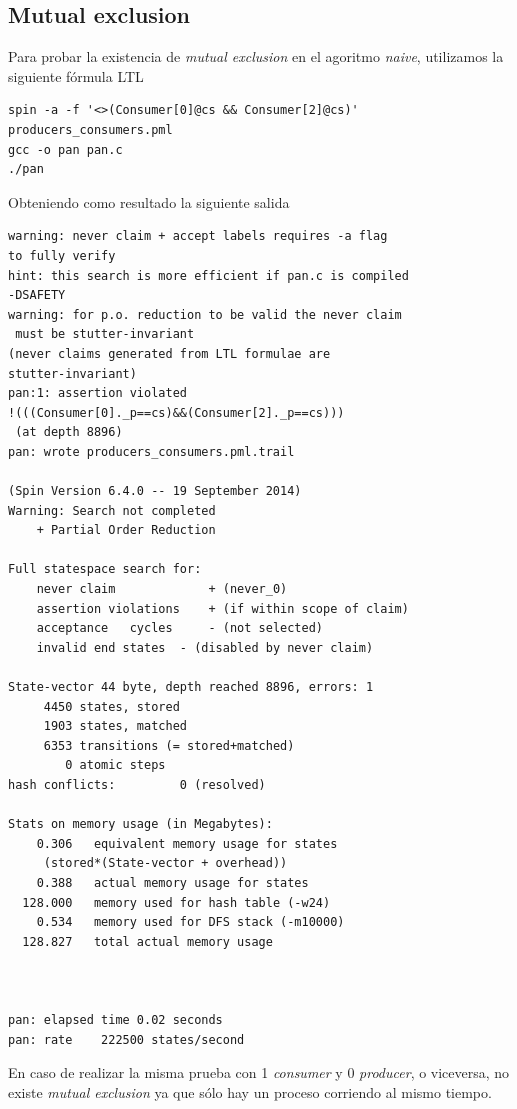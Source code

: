 \documentclass[a4paper,12pt]{article}
\begin{document}
\subsection{Mutual exclusion}
Para probar la existencia de \textit{mutual exclusion} en el agoritmo \textit{naive}, utilizamos la siguiente fórmula LTL

\begin{lstlisting}[frame=single]
spin -a -f '<>(Consumer[0]@cs && Consumer[2]@cs)' 
producers_consumers.pml
gcc -o pan pan.c 
./pan
\end{lstlisting}

\newpage

Obteniendo como resultado la siguiente salida

\begin{lstlisting}[frame=single]
warning: never claim + accept labels requires -a flag 
to fully verify
hint: this search is more efficient if pan.c is compiled 
-DSAFETY
warning: for p.o. reduction to be valid the never claim
 must be stutter-invariant
(never claims generated from LTL formulae are 
stutter-invariant)
pan:1: assertion violated  
!(((Consumer[0]._p==cs)&&(Consumer[2]._p==cs)))
 (at depth 8896)
pan: wrote producers_consumers.pml.trail

(Spin Version 6.4.0 -- 19 September 2014)
Warning: Search not completed
	+ Partial Order Reduction

Full statespace search for:
	never claim         	+ (never_0)
	assertion violations	+ (if within scope of claim)
	acceptance   cycles 	- (not selected)
	invalid end states	- (disabled by never claim)

State-vector 44 byte, depth reached 8896, errors: 1
     4450 states, stored
     1903 states, matched
     6353 transitions (= stored+matched)
        0 atomic steps
hash conflicts:         0 (resolved)

Stats on memory usage (in Megabytes):
    0.306	equivalent memory usage for states
     (stored*(State-vector + overhead))
    0.388	actual memory usage for states
  128.000	memory used for hash table (-w24)
    0.534	memory used for DFS stack (-m10000)
  128.827	total actual memory usage



pan: elapsed time 0.02 seconds
pan: rate    222500 states/second

\end{lstlisting}

En caso de realizar la misma prueba con 1 \textit{consumer} y 0 \textit{producer}, o viceversa, no existe \textit{mutual exclusion} ya que sólo hay un proceso corriendo al mismo tiempo.
\end{document}
